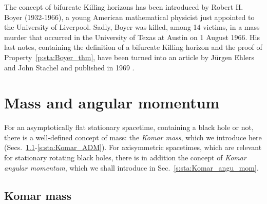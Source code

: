 \begin{hist} \label{h:sta:Boyer}
The concept of bifurcate Killing horizons has been introduced by Robert H. Boyer
(1932-1966), a young American mathematical physicist just appointed to the University
of Liverpool. Sadly, Boyer was killed, among 14 victims, in a mass murder that
occurred in the University of Texas at Austin on 1 August 1966.
His last notes, containing the definition of a bifurcate Killing horizon
and the proof of Property~\ref{p:sta:Boyer_thm}, have been turned into an article
by Jürgen Ehlers and John Stachel and published in 1969 \cite{Boyer69}.
\end{hist}



\section{Mass and angular momentum} \label{s:sta:mass_angul_mom}

For an asymptotically flat stationary spacetime, containing a
black hole or not, there is a well-defined concept of mass: the \emph{Komar mass},
which we introduce here (Secs.~\ref{s:sta:Komar_mass}-\ref{s:sta:Komar_ADM}).
For axisymmetric spacetimes, which are relevant
for stationary rotating black holes, there is in addition the concept
of \emph{Komar angular momentum}, which we shall introduce in Sec.~\ref{s:sta:Komar_angu_mom}.

\subsection{Komar mass} \label{s:sta:Komar_mass}

